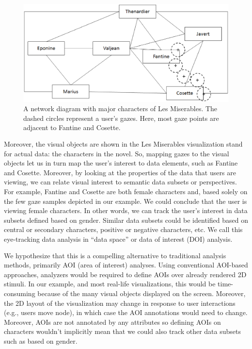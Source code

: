 \begin{figure}[htb]
  \centering
  \includegraphics[width=0.99\linewidth]{images/MiserablesSimple.eps}
  \caption{A network diagram with major characters of Les Miserables. The dashed circles represent a user's gazes. Here, most gaze points are adjacent to Fantine and Cosette. }
    \label{fig:MiserablesSimple}
\end{figure}

Moreover, the visual objects are shown in the Les Miserables visualization stand for actual data: the characters in the novel. So, mapping gazes to the visual objects let us in turn map the user's interest to data elements, such as Fantine and Cosette. Moreover, by looking at the properties of the data that users are viewing, we can relate visual interest to semantic data subsets or perspectives. For example, Fantine and Cosette are both female characters and, based solely on the few gaze samples depicted in our example. We could conclude that the user is viewing female characters. In other words, we can track the user's interest in data subsets defined based on gender. Similar data subsets could be identified based on central or secondary characters, positive or negative characters, etc. We call this eye-tracking data analysis in ``data space'' or data of interest (DOI) analysis.

We hypothesize that this is a compelling alternative to traditional analysis methods, primarily AOI (area of interest) analyses. Using conventional AOI-based approaches, analyzers would be required to define AOIs over already rendered 2D stimuli. In our example, and most real-life visualizations, this would be time-consuming because of the many visual objects displayed on the screen. Moreover, the 2D layout of the visualization may change in response to user interactions (e.g., users move node), in which case the AOI annotations would need to change. Moreover, AOIs are not annotated by any attributes so defining AOIs on characters wouldn't implicitly mean that we could also track other data subsets such as based on gender.  

